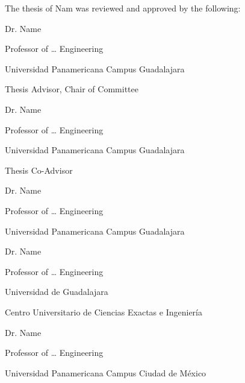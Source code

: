 
The thesis of Nam was reviewed and approved by the following:
\vspace{2em}

\hspace{1cm} Dr. Name 

\hspace{1cm} Professor of … Engineering

\hspace{1cm} Universidad Panamericana Campus Guadalajara

\hspace{1cm} Thesis Advisor, Chair of Committee

\vspace{2em}

\hspace{1cm} Dr. Name

\hspace{1cm} Professor of … Engineering

\hspace{1cm} Universidad Panamericana Campus Guadalajara

\hspace{1cm} Thesis Co-Advisor

\vspace{2em}

\hspace{1cm} Dr. Name

\hspace{1cm} Professor of … Engineering

\hspace{1cm} Universidad Panamericana Campus Guadalajara

\vspace{2em}

\hspace{1cm} Dr. Name

\hspace{1cm} Professor of … Engineering

\hspace{1cm} Universidad de Guadalajara

\hspace{1cm} Centro Universitario de Ciencias Exactas e Ingeniería

\vspace{2em}

\hspace{1cm} Dr. Name

\hspace{1cm} Professor of … Engineering

\hspace{1cm} Universidad Panamericana Campus Ciudad de México



\clearpage
